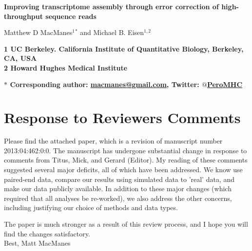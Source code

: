 \documentclass[11pt]{article}
\begin{document}
\begin{flushleft}


{\Large
\textbf{Improving transcriptome assembly through error correction of high-throughput sequence reads}
}
\\ 
\vspace{4mm}

\noindent
Matthew D MacManes$^{1}$$^\ast$ and
Michael B. Eisen$^{1,2}$ \\
\vspace{5mm}

\bf{1} \textnormal{UC Berkeley. California Institute of Quantitative Biology, Berkeley, CA, USA} \\
\bf{2} \textnormal{Howard Hughes Medical Institute} \\
\vspace{2mm}
 
\bf{$\ast$} \textnormal{Corresponding author: \href{mailto:macmanes@gmail.com}{macmanes@gmail.com}, Twitter: \href{https://twitter.com/PeroMHC}{$@$PeroMHC}}
\end{flushleft}
\vspace{4mm}



\section*{Response to Reviewers Comments}

\hspace{5mm} Please find the attached paper, which is a revision of manuscript number 2013:04:462:0:0. The manuscript has undergone substantial change in response to comments from Titus, Mick, and Gerard (Editor).  My reading of these comments suggested several major deficits, all of which have been addressed. We know use paired-end data, compare our results using simulated data to 'real' data, and make our data publicly available. In addition to these major changes (which required that all analyses be re-worked), we also address the other concerns, including justifying our choice of methods and data types. 

The paper is much stronger as a result of this review process, and I hope you will find the changes satisfactory. \\

\noindent
Best, Matt MacManes 
\end{document}
